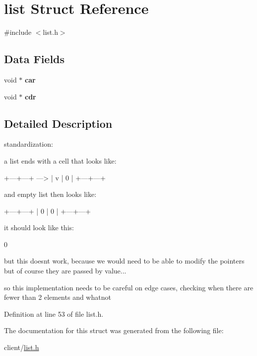 \hypertarget{structlist}{
\section{list Struct Reference}
\label{structlist}
}


{\ttfamily \#include $<$list.h$>$}

\subsection*{Data Fields}
\begin{DoxyCompactItemize}
\item 
\hypertarget{structlist_a670d4dd718e4fd0fbb7dfbab5c72dcfb}{
void $\ast$ {\bfseries car}}
\label{structlist_a670d4dd718e4fd0fbb7dfbab5c72dcfb}

\item 
\hypertarget{structlist_abb8280ac99531815a51430b637495ee7}{
void $\ast$ {\bfseries cdr}}
\label{structlist_abb8280ac99531815a51430b637495ee7}

\end{DoxyCompactItemize}


\subsection{Detailed Description}
standardization:

a list ends with a cell that looks like:


\begin{DoxyCode}
     +---+---+   
---> | v | 0 |   
     +---+---+   
\end{DoxyCode}


and empty list then looks like:


\begin{DoxyCode}
+---+---+   
| 0 | 0 |   
+---+---+   
\end{DoxyCode}


it should look like this:


\begin{DoxyCode}
0
\end{DoxyCode}


but this doesnt work, because we would need to be able to modify the pointers but of course they are passed by value...

so this implementation needs to be careful on edge cases, checking when there are fewer than 2 elements and whatnot 

Definition at line 53 of file list.h.



The documentation for this struct was generated from the following file:\begin{DoxyCompactItemize}
\item 
client/\hyperlink{list_8h}{list.h}\end{DoxyCompactItemize}

